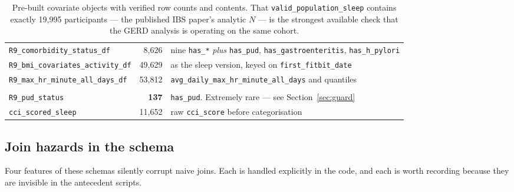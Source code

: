 \documentclass[11pt]{article}
\newcommand{\code}[1]{\texttt{\small #1}}
\begin{document}
\begin{table}[h]
\begin{tabular}{@{}p{5.2cm} r p{6.4cm}@{}}
\code{R9_comorbidity_status_df} & 8,626 & nine \code{has_*} \emph{plus} \code{has_pud},
\code{has_gastroenteritis}, \code{has_h_pylori} \\
\code{R9_bmi_covariates_activity_df} & 49,629 & as the sleep version, keyed on \code{first_fitbit_date} \\
\code{R9_max_hr_minute_all_days_df} & 53,812 & \code{avg_daily_max_hr_minute_all_days} and quantiles \\
\addlinespace
\multicolumn{3}{@{}l}{\emph{Shared}}\\
\code{R9_pud_status} & \textbf{137} & \code{has_pud}. Extremely rare --- see Section~\ref{sec:guard} \\
\code{cci_scored_sleep} & 11,652 & raw \code{cci_score} before categorisation \\
\bottomrule
\end{tabular}
\caption{Pre-built covariate objects with verified row counts and contents. That
\code{valid_population_sleep} contains exactly 19,995 participants --- the published IBS paper's
analytic $N$ --- is the strongest available check that the GERD analysis is operating on the same
cohort.}
\label{tab:prebuilt}
\end{table}

\subsection{Join hazards in the schema}
\label{sec:joinhazards}
Four features of these schemas silently corrupt naive joins. Each is handled explicitly in the code,
and each is worth recording because they are invisible in the antecedent scripts.
\end{document}
